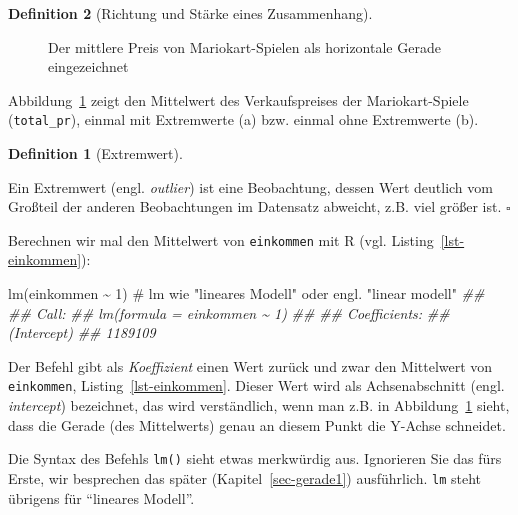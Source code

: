 \documentclass[
  a4paper,
  DIV=11]{scrreprt}
\newenvironment{Shaded}{\begin{snugshade}}{\end{snugshade}}
\newcommand{\CommentTok}[1]{\textcolor[rgb]{0.37,0.37,0.37}{#1}}
\newcommand{\DecValTok}[1]{\textcolor[rgb]{0.68,0.00,0.00}{#1}}
\newcommand{\DocumentationTok}[1]{\textcolor[rgb]{0.37,0.37,0.37}{\textit{#1}}}
\newcommand{\FunctionTok}[1]{\textcolor[rgb]{0.28,0.35,0.67}{#1}}
\newcommand{\NormalTok}[1]{\textcolor[rgb]{0.00,0.23,0.31}{#1}}
\newcommand{\SpecialCharTok}[1]{\textcolor[rgb]{0.37,0.37,0.37}{#1}}
\theoremstyle{definition}
\theoremstyle{definition}
\theoremstyle{definition}
\newtheorem{definition}{Definition}[chapter]
\theoremstyle{remark}
\begin{document}
\begin{definition}[Richtung und Stärke eines
Zusammenhang]
\begin{figure}
\begin{minipage}{0.50\linewidth}
{}


\end{minipage}%

\caption{\label{fig-mw2}Der mittlere Preis von Mariokart-Spielen als
horizontale Gerade eingezeichnet}

\end{figure}%

Abbildung~\ref{fig-mw2} zeigt den Mittelwert des Verkaufspreises der
Mariokart-Spiele (\texttt{total\_pr}), einmal mit Extremwerte (a) bzw.
einmal ohne Extremwerte (b).

\begin{definition}[Extremwert]\protect\hypertarget{def-extremwert}{}\label{def-extremwert}

Ein Extremwert (engl. \emph{outlier}) ist eine Beobachtung, dessen Wert
deutlich vom Großteil der anderen Beobachtungen im Datensatz abweicht,
z.B. viel größer ist. \(\square\)

\end{definition}

Berechnen wir mal den Mittelwert von \texttt{einkommen} mit R (vgl.
Listing~\ref{lst-einkommen}):

\begin{Shaded}
\begin{Highlighting}[]
\FunctionTok{lm}\NormalTok{(einkommen }\SpecialCharTok{\textasciitilde{}} \DecValTok{1}\NormalTok{)  }\CommentTok{\# lm wie "lineares Modell" oder engl. "linear modell"}
\DocumentationTok{\#\# }
\DocumentationTok{\#\# Call:}
\DocumentationTok{\#\# lm(formula = einkommen \textasciitilde{} 1)}
\DocumentationTok{\#\# }
\DocumentationTok{\#\# Coefficients:}
\DocumentationTok{\#\# (Intercept)  }
\DocumentationTok{\#\#     1189109}
\end{Highlighting}
\end{Shaded}

Der Befehl gibt als \emph{Koeffizient} einen Wert zurück und zwar den
Mittelwert von \texttt{einkommen}, Listing~\ref{lst-einkommen}. Dieser
Wert wird als Achsenabschnitt (engl. \emph{intercept}) bezeichnet, das
wird verständlich, wenn man z.B. in Abbildung~\ref{fig-mw2} sieht, dass
die Gerade (des Mittelwerts) genau an diesem Punkt die Y-Achse
schneidet.

Die Syntax des Befehls \texttt{lm()} sieht etwas merkwürdig aus.
Ignorieren Sie das fürs Erste, wir besprechen das später
(Kapitel~\ref{sec-gerade1}) ausführlich. \texttt{lm} steht übrigens für
``lineares Modell''.


\end{definition}
\end{document}
